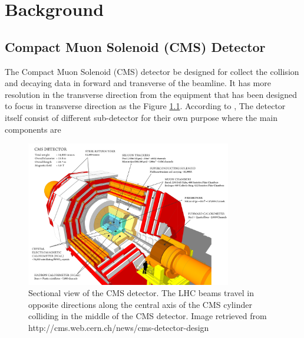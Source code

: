 \chapter{Background}


\section{Compact Muon Solenoid (CMS) Detector}

The Compact Muon Solenoid (CMS) detector be designed for collect the collision and decaying data in forward and transverse of the beamline.
It has more resolution in the transverse direction from the equipment that has been designed to focus in transverse direction as the Figure \ref{fig:cms_structure}.
According to \cite{cms_design_report}, The detector itself consist of different sub-detector for their own purpose where the main components are
\begin{figure}[h!]
    \centering
    \includegraphics[width=0.8\textwidth]{images/cms_structure.png}
    \caption{Sectional view of the CMS detector. The LHC beams travel in opposite directions along the central axis of the CMS cylinder colliding in the middle of the CMS detector. Image retrieved from http://cms.web.cern.ch/news/cms-detector-design}
    \label{fig:cms_structure}
\end{figure}
